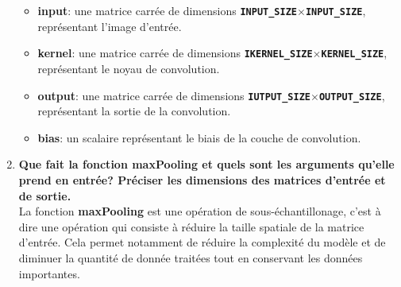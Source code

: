 \documentclass[a4paper, 12pt, openany]{book}
\begin{document}
\begin{enumerate}
{\begin{itemize}
      \item \textbf{input}: une matrice carrée de dimensions \textbf{\lstinline{INPUT_SIZE}}$\times$\textbf{\lstinline{INPUT_SIZE}}, représentant l'image d'entrée.
      \item \textbf{kernel}: une matrice carrée de dimensions \textbf{\lstinline{IKERNEL_SIZE}}$\times$\textbf{\lstinline{KERNEL_SIZE}}, représentant le noyau de convolution.
      \item \textbf{output}: une matrice carrée de dimensions \textbf{\lstinline{IUTPUT_SIZE}}$\times$\textbf{\lstinline{OUTPUT_SIZE}}, représentant la sortie de la convolution.
      \item \textbf{bias}: un scalaire représentant le biais de la couche de convolution. \\
    \end{itemize}
  }
  \item {
    \textbf{Que fait la fonction maxPooling et quels sont les arguments qu'elle prend en entrée? Préciser les dimensions des matrices d'entrée et de sortie.} \vspace{0.2cm}\\
    La fonction \textbf{maxPooling} est une opération de sous-échantillonage, c'est à dire une opération qui consiste à réduire la taille spatiale de la matrice d'entrée.
    Cela permet notamment de réduire la complexité du modèle et de diminuer la quantité de donnée traitées tout en conservant les données importantes.

}
\end{enumerate}
\end{document}
